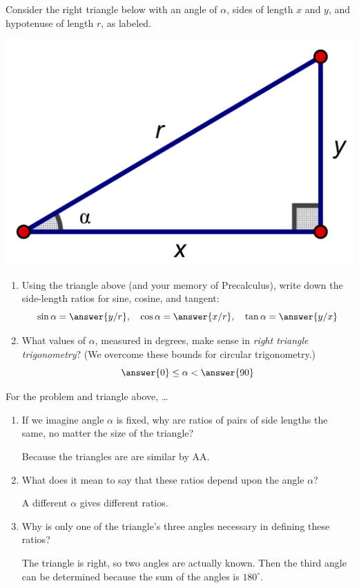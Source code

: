\documentclass[nooutcomes]{ximera}
\begin{document}
\begin{problem}
Consider the right triangle below with an angle of $\alpha$, sides of length $x$ and $y$, and hypotenuse of length $r$, as labeled.  
\begin{image}
\includegraphics[scale=0.8]{rightTriangle.png}
\end{image}
\begin{enumerate}
\item Using the triangle above (and your memory of Precalculus), write down the side-length ratios for sine, cosine, and tangent:  
\[
\sin\alpha = \answer{y/r}, \quad
 \cos\alpha = \answer{x/r}, \quad
  \tan\alpha = \answer{y/x}
\]
\item What values of $\alpha$, measured in degrees, make sense in \emph{right triangle trigonometry}?  (We overcome these bounds for circular trigonometry.)
\[
\answer{0} \le \alpha < \answer{90}
\]  
\end{enumerate}
\end{problem}

\begin{problem}
For the problem and triangle above, \dots
\begin{enumerate}
\item If we imagine angle $\alpha$ is fixed, why are ratios of pairs of side lengths the same, no matter the size of the triangle?
  \begin{hint}Because the triangles are are similar by AA.  \end{hint}
\item What does it mean to say that these ratios depend upon the angle $\alpha$?  
  \begin{hint}A different $\alpha$ gives different ratios.\end{hint}
\item Why is only one of the triangle's three angles necessary in defining these ratios?  
  \begin{hint}The triangle is right, so two angles are actually known.  Then the third angle can be determined because the sum of the angles is $180^\circ$.\end{hint}  
\end{enumerate}
\begin{freeResponse}
\end{freeResponse}
\end{problem}
\end{document}
